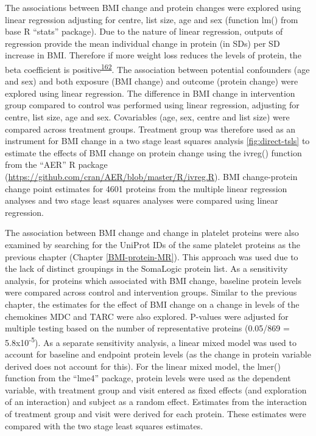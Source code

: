 \documentclass[11pt,twoside]{bristolthesis}
\begin{document}
The associations between BMI change and protein changes were explored using linear regression adjusting for centre, list size, age and sex (function lm() from base R ``stats'' package). Due to the nature of linear regression, outputs of regression provide the mean individual change in protein (in SDs) per SD increase in BMI. Therefore if more weight loss reduces the levels of protein, the beta coefficient is positive\textsuperscript{\protect\hyperlink{ref-Figarska2020}{162}}. The association between potential confounders (age and sex) and both exposure (BMI change) and outcome (protein change) were explored using linear regression. The difference in BMI change in intervention group compared to control was performed using linear regression, adjusting for centre, list size, age and sex. Covariables (age, sex, centre and list size) were compared across treatment groups. Treatment group was therefore used as an instrument for BMI change in a two stage least squares analysis \ref{fig:direct-tsls} to estimate the effects of BMI change on protein change using the ivreg() function from the ``AER'' R package (\url{https://github.com/cran/AER/blob/master/R/ivreg.R}). BMI change-protein change point estimates for 4601 proteins from the multiple linear regression analyses and two stage least squares analyses were compared using linear regression.

The association between BMI change and change in platelet proteins were also examined by searching for the UniProt IDs of the same platelet proteins as the previous chapter (Chapter \ref{BMI-protein-MR}). This approach was used due to the lack of distinct groupings in the SomaLogic protein list. As a sensitivity analysis, for proteins which associated with BMI change, baseline protein levels were compared across control and intervention groups. Similar to the previous chapter, the estimates for the effect of BMI change on a change in levels of the chemokines MDC and TARC were also explored. P-values were adjusted for multiple testing based on the number of representative proteins (0.05/869 = 5.8x10\textsuperscript{-5}). As a separate sensitivity analysis, a linear mixed model was used to account for baseline and endpoint protein levels (as the change in protein variable derived does not account for this). For the linear mixed model, the lmer() function from the ``lme4'' package, protein levels were used as the dependent variable, with treatment group and visit entered as fixed effects (and exploration of an interaction) and subject as a random effect. Estimates from the interaction of treatment group and visit were derived for each protein. These estimates were compared with the two stage least squares estimates.
\end{document}
